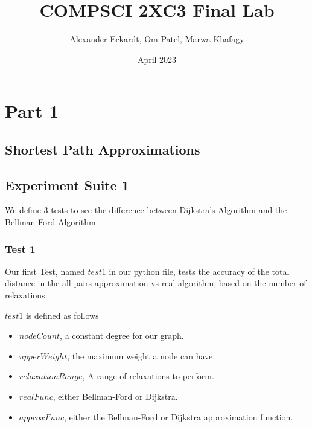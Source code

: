 \documentclass{article}
\title{COMPSCI 2XC3 Final Lab}
\author{Alexander Eckardt, Om Patel, Marwa Khafagy}
\date{April 2023}
\begin{document}
\maketitle
\newpage

\tableofcontents
\newpage

\listoffigures
\newpage



\section{Part 1}


\subsection{Shortest Path Approximations}



\subsection{Experiment Suite 1}

We define 3 tests to see the difference between Dijkstra's Algorithm and the Bellman-Ford Algorithm.


\subsubsection{Test 1}

Our first Test, named $test1$ in our python file, tests the accuracy of the total distance in the all pairs approximation vs real algorithm, based on the number of relaxations.

$test1$ is defined as follows
\begin{itemize}
    \item $nodeCount$, a constant degree for our graph.
    \item $upperWeight$, the maximum weight a node can have.
    \item $relaxationRange$, A range of relaxations to perform.
    \item $realFunc$, either Bellman-Ford or Dijkstra.
    \item $approxFunc$, either the Bellman-Ford or Dijkstra approximation function.
\end{itemize}
\end{document}
